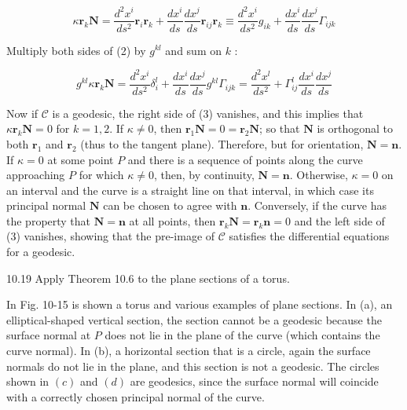 \documentclass[10pt]{article}
\begin{document}
\begin{equation*}
\kappa \mathbf{r}_{k} \mathbf{N}=\frac{d^{2} x^{i}}{d s^{2}} \mathbf{r}_{i} \mathbf{r}_{k}+\frac{d x^{i}}{d s} \frac{d x^{j}}{d s} \mathbf{r}_{i j} \mathbf{r}_{k} \equiv \frac{d^{2} x^{i}}{d s^{2}} g_{i k}+\frac{d x^{i}}{d s} \frac{d x^{j}}{d s} \Gamma_{i j k} \tag{2}
\end{equation*}


Multiply both sides of (2) by $g^{k l}$ and sum on $k$ :


\begin{equation*}
g^{k l} \kappa \mathbf{r}_{k} \mathbf{N}=\frac{d^{2} x^{i}}{d s^{2}} \delta_{i}^{l}+\frac{d x^{i}}{d s} \frac{d x^{j}}{d s} g^{k l} \Gamma_{i j k}=\frac{d^{2} x^{l}}{d s^{2}}+\Gamma_{i j}^{l} \frac{d x^{i}}{d s} \frac{d x^{j}}{d s} \tag{3}
\end{equation*}


Now if $\mathscr{C}$ is a geodesic, the right side of (3) vanishes, and this implies that $\kappa \mathbf{r}_{k} \mathbf{N}=0$ for $k=1,2$. If $\kappa \neq 0$, then $\mathbf{r}_{1} \mathbf{N}=0=\mathbf{r}_{2} \mathbf{N}$; so that $\mathbf{N}$ is orthogonal to both $\mathbf{r}_{1}$ and $\mathbf{r}_{2}$ (thus to the tangent plane). Therefore, but for orientation, $\mathbf{N}=\mathbf{n}$. If $\kappa=0$ at some point $P$ and there is a sequence of points along the curve approaching $P$ for which $\kappa \neq 0$, then, by continuity, $\mathbf{N}=\mathbf{n}$. Otherwise, $\kappa=0$ on an interval and the curve is a straight line on that interval, in which case its principal normal $\mathbf{N}$ can be chosen to agree with $\mathbf{n}$. Conversely, if the curve has the property that $\mathbf{N}=\mathbf{n}$ at all points, then $\mathbf{r}_{k} \mathbf{N}=\mathbf{r}_{k} \mathbf{n}=0$ and the left side of (3) vanishes, showing that the pre-image of $\mathscr{C}$ satisfies the differential equations for a geodesic.

10.19 Apply Theorem 10.6 to the plane sections of a torus.

In Fig. 10-15 is shown a torus and various examples of plane sections. In (a), an elliptical-shaped vertical section, the section cannot be a geodesic because the surface normal at $P$ does not lie in the plane of the curve (which contains the curve normal). In (b), a horizontal section that is a circle, again the surface normals do not lie in the plane, and this section is not a geodesic. The circles shown in $(c)$ and $(d)$ are geodesics, since the surface normal will coincide with a correctly chosen principal normal of the curve.
\end{document}

